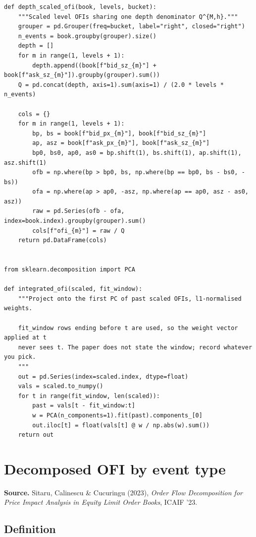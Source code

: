 \documentclass[11pt]{article}
\begin{document}
\begin{lstlisting}[caption={Integrated OFI. The PCA is fitted on past data only; the
window is a choice the paper leaves open, so it is a parameter here.}]
def depth_scaled_ofi(book, levels, bucket):
    """Scaled level OFIs sharing one depth denominator Q^{M,h}."""
    grouper = pd.Grouper(freq=bucket, label="right", closed="right")
    n_events = book.groupby(grouper).size()
    depth = []
    for m in range(1, levels + 1):
        depth.append((book[f"bid_sz_{m}"] + book[f"ask_sz_{m}"]).groupby(grouper).sum())
    Q = pd.concat(depth, axis=1).sum(axis=1) / (2.0 * levels * n_events)

    cols = {}
    for m in range(1, levels + 1):
        bp, bs = book[f"bid_px_{m}"], book[f"bid_sz_{m}"]
        ap, asz = book[f"ask_px_{m}"], book[f"ask_sz_{m}"]
        bp0, bs0, ap0, as0 = bp.shift(1), bs.shift(1), ap.shift(1), asz.shift(1)
        ofb = np.where(bp > bp0, bs, np.where(bp == bp0, bs - bs0, -bs))
        ofa = np.where(ap > ap0, -asz, np.where(ap == ap0, asz - as0, asz))
        raw = pd.Series(ofb - ofa, index=book.index).groupby(grouper).sum()
        cols[f"ofi_{m}"] = raw / Q
    return pd.DataFrame(cols)


from sklearn.decomposition import PCA

def integrated_ofi(scaled, fit_window):
    """Project onto the first PC of past scaled OFIs, l1-normalised weights.

    fit_window rows ending before t are used, so the weight vector applied at t
    never sees t. The paper does not state the window; record whatever you pick.
    """
    out = pd.Series(index=scaled.index, dtype=float)
    vals = scaled.to_numpy()
    for t in range(fit_window, len(scaled)):
        past = vals[t - fit_window:t]
        w = PCA(n_components=1).fit(past).components_[0]
        out.iloc[t] = float(vals[t] @ w / np.abs(w).sum())
    return out
\end{lstlisting}

\section{Decomposed OFI by event type}\label{sec:dofi}

\textbf{Source.} Sitaru, Calinescu \& Cucuringu (2023), \emph{Order Flow
Decomposition for Price Impact Analysis in Equity Limit Order Books}, ICAIF '23.

\subsection{Definition}
\end{document}
